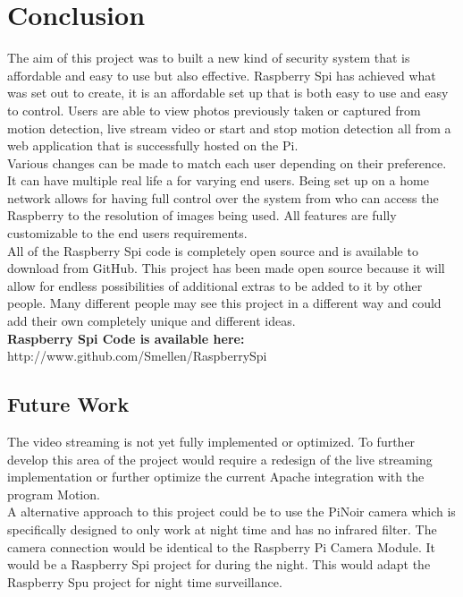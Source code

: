 \documentclass[12pt]{report}
\begin{document}
\chapter{Conclusion}
\label{ch:concl}
%
%
%
%
The aim of this project was to built a new kind of security system that is affordable and easy to use but also effective. Raspberry Spi has achieved what was set out to create, it is an affordable set up that is both easy to use and easy to control. Users are able to view photos previously taken or captured from motion detection, live stream video or start and stop motion detection all from a web application that is successfully hosted on the Pi. \\

Various changes can be made to match each user depending on their preference. It can have multiple real life a for varying end users. Being set up on a home network allows for having full control over the system from who can access the Raspberry to the resolution of images being used. All features are fully customizable to the end users requirements.\\

All of the Raspberry Spi code is completely open source and is available to download from GitHub. This project has been made open source because it will allow for endless possibilities of additional extras to be added to it by other people. Many different people may see this project in a different way and could add their own completely unique and different ideas.\\

\noindent
{\bf Raspberry Spi Code is available here:\\}
{http://www.github.com/Smellen/RaspberrySpi}



\section{Future Work}
\label{sec:future}

The video streaming is not yet fully implemented or optimized. To further develop this area of the project would require a redesign of the live streaming implementation or further optimize the current Apache integration with the program Motion.\\

A alternative approach to this project could be to use the PiNoir camera which is specifically designed to only work at night time and has no infrared filter. The camera connection would be identical to the Raspberry Pi Camera Module. It would be a Raspberry Spi project for during the night. This would adapt the Raspberry Spu project for night time surveillance.\\
\end{document}
